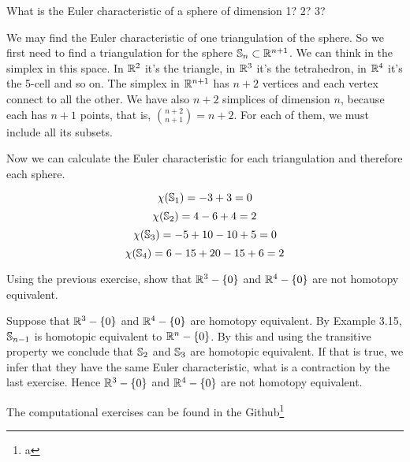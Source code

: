 \noindent\linia

\begin{exercise}
    What is the Euler characteristic of a sphere of dimension 1? 2? 3? 
\end{exercise}

We may find the Euler characteristic of one triangulation of the sphere. So we
first need to find a triangulation for the sphere $\mathbb{S}_n \subset
\mathbb{R}^{n+1}$. We can think in the simplex in this space. In $\mathbb{R}^2$ it's the
triangle, in  $\mathbb{R}^3$ it's the tetrahedron, in $\mathbb{R}^4$ it's the 5-cell and so
on. The simplex in $\mathbb{R}^{n+1}$ has $n + 2$ vertices and each vertex connect to
all the other. We have also $n+2$ simplices of dimension $n$, because each
has $n+1$ points, that is, $\genfrac(){0pt}{}{n+2}{n+1} = n+2$. For each of them, we
must include all its subsets. 

Now we can calculate the Euler characteristic for each triangulation and
therefore each sphere. 

$$
\chi(\mathbb{S}_1) = -3 + 3 = 0 
$$
$$
\chi(\mathbb{S}_2) = 4 - 6 + 4 = 2 
$$
$$
\chi(\mathbb{S}_3) = -5 + 10 - 10 + 5 = 0  
$$
$$
\chi(\mathbb{S}_4) = 6 - 15 + 20 - 15 + 6 = 2  
$$

\noindent\linia

\begin{exercise}
    Using the previous exercise, show that $\mathbb{R}^3 - \{0\}$ and $\mathbb{R}^4 - \{0\}$ are not homotopy equivalent.
\end{exercise}

Suppose that $\mathbb{R}^3 - \{0\}$ and $\mathbb{R}^4 - \{0\}$ are homotopy equivalent. By
Example 3.15, $\mathbb{S}_{n-1}$ is homotopic equivalent to $\mathbb{R}^n - \{0\}$. By
this and using the transitive property we conclude that $\mathbb{S}_2$ and
$\mathbb{S}_3$ are homotopic equivalent. If that is true, we infer that they have
the same Euler characteristic, what is a contraction by the last exercise.
Hence $\mathbb{R}^3 - \{0\}$ and $\mathbb{R}^4 - \{0\}$ are not homotopy equivalent.

\noindent\linia

The computational exercises can be found in the Github\footnote{a}